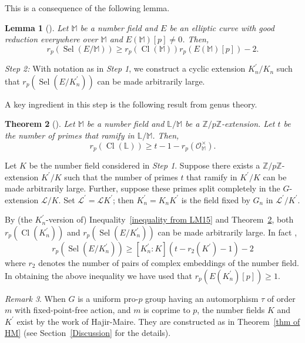 \documentclass{amsart}
\DeclareMathOperator{\Cl}{Cl}
\DeclareMathOperator{\Sel}{Sel}
\newcommand{\FF}{\mathbb M}
\newcommand{\ZZ}{\mathbb Z}
\newcommand{\Linf}{\mathcal{L}}
\newtheorem{Th}{Theorem}[section]
\newtheorem{Lemma}[Th]{Lemma}
\theoremstyle{definition}
\theoremstyle{remark}
\newtheorem{rem}[Th]{Remark}
\begin{document}
This is a consequence of the following lemma.
\begin{Lemma}[{\cite[Proposition 4.1(i)]{LM15_CM}}]
Let $\FF$ be a number field and $E$ be an elliptic curve with good reduction everywhere over $\FF$ and $E(\FF)[p]\neq 0$. 
Then,
\begin{equation}
\label{eqn: alter for fsg}
r_p \left( \Sel\left( E/\FF\right)\right) \geq r_p \left(\Cl(\FF)\right) r_p\left( E(\FF)[p]\right) - 2.
\end{equation}
\end{Lemma}  

\noindent \textit{Step 2:} With notation as in \textit{Step 1}, we construct a cyclic extension $K_n^\prime/K_n$ such that $r_p \left( \Sel\left( E/K_n^\prime\right)\right)$ can be made arbitrarily large.

A key ingredient in this step is the following result from genus theory.
\begin{Th}[\cite{Sch86}]
\label{genus theory}
Let $\FF$ be a number field and $\mathbb{L}/\FF$ be a $\ZZ/p\ZZ$-extension.
Let $t$ be the number of primes that ramify in $\mathbb{L}/\FF$.
Then,
\[
r_p \left( \Cl(\mathbb{L})\right) \geq t- 1 -r_p \left( \mathcal{O}_{\FF}^\times \right).
\]
\end{Th}

Let $K$ be the number field considered in \textit{Step 1}.
Suppose there exists a $\ZZ/p\ZZ$-extension $K^\prime/K$ such that the number of primes $t$ that ramify in $K^\prime/K$ can be made arbitrarily large.
Further, suppose these primes split completely in the $G$-extension $\Linf/K$.
Set $\Linf^\prime = \Linf K^\prime$; then $K_n^\prime = K_n K^\prime$ is the field fixed by $G_n$ in $\Linf^\prime/K^\prime$.

By (the $K_n^\prime$-version of) Inequality~\ref{inequality from LM15} and Theorem~\ref{genus theory}, both $r_p \left( \Cl(K_n^\prime)\right)$ and $r_p \left( \Sel\left( E/K_n^\prime\right)\right)$ can be made arbitrarily large.
In fact \cite[Page 609]{HM19},
\begin{equation}
\label{what genus theory gives us}
r_p \left( \Sel(E/K_n^\prime)\right) \geq [K_n^\prime: K]\left(t-r_2(K^\prime)-1\right)-2
\end{equation}
where $r_2$ denotes the number of pairs of complex embeddings of the number field.
In obtaining the above inequality we have used that $r_p\left(E(K_n^\prime)[p]\right)\geq 1$.

\begin{rem}
When $G$ is a uniform pro-$p$ group having an automorphism $\tau$ of order $m$ with fixed-point-free action, and $m$ is coprime to $p$, the number fields $K$ and $K^\prime$ exist by the work of Hajir-Maire.
They are constructed as in Theorem~\ref{thm of HM} (see Section~\ref{Discussion} for the details).
\end{rem}
\end{document}
